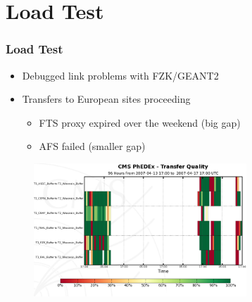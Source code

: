 \documentclass{beamer}
\begin{document}
\section{Load Test}
\begin{frame}
    \frametitle{Load Test}
    \begin{itemize}
        \item Debugged link problems with FZK/GEANT2
        \item Transfers to European sites proceeding
        \begin{itemize}
            \item FTS proxy expired over the weekend (big gap)
            \item AFS failed (smaller gap)
        \end{itemize}
    \end{itemize}
    \begin{figure}
        \includegraphics*[height=5cm]{Graphics/phedex.png}
    \end{figure}
\end{frame}
\end{document}
